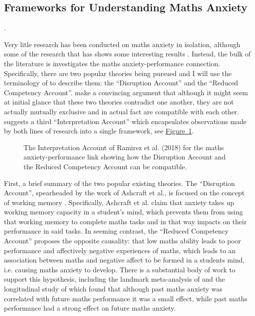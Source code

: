 \documentclass[twoside,12pt,a4paper]{report}
\newcommand{\reffig}[1]{\hyperref[fig:#1]{Figure~\ref{fig:#1}}}
\begin{document}
\subsection*{Frameworks for Understanding Maths Anxiety}.

Very litle research has been conducted on maths anxiety in isolation, although some of the research that has shows some interesting results \cite{Young2012, Lyons2012pain}. Instead, the bulk of the literature is investigates the maths anxiety-performance connection.  Specifically, there are two popular theories being pursued and I will use the terminology of  to describe them: the ``Disruption Account'' and the ``Reduced Competency Account''.  make a convincing argument that although it might seem at initial glance that these two theories contradict one another, they are not actually mutually exclusive and in actual fact are compatible with each other.  suggests a third ``Interpretation Account'' which encapsulates observations made by both lines of research into a single framework, see \reffig{ramirez}.

\begin{figure}
\begin{center}

\caption{The Interpretation Account of 
Ramirez et al. (2018)
for the maths anxiety-performance link showing how the Disruption Account and the Reduced Competency Account can be compatible.
\label{fig:ramirez}
}
\end{center}
\end{figure}

First, a brief summary of the two popular existing theories. The ``Disruption Account'', spearheaded by the work of Ashcraft et al., is focused on the concept of working memory \cite{Ashcraft2001, Ashcraft2007}. Specifically, Ashcraft et al. claim that anxiety takes up working memory capacity in a student's mind, which prevents them from using that working memory to complete maths tasks and in that way impacts on their performance in said tasks. In seeming contrast, the ``Reduced Competency Account'' proposes the opposite causality: that low maths ability leads to poor performance and affectively negative experiences of maths, which leads to an association between maths and negative affect to be formed in a students mind, i.e. causing maths anxiety to develop. There is a substantial body of work to support this hypothesis, including the landmark meta-analysis of  and the longitudinal study of  which found that although past maths anxiety was correlated with future maths performance it was a small effect, while past maths performance had a strong effect on future maths anxiety.
\end{document}
